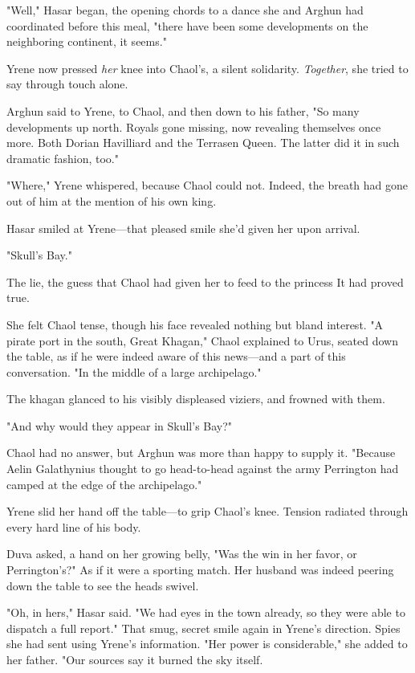 "Well," Hasar began, the opening chords to a dance she and Arghun had coordinated before this meal, "there have been some 
developments on the neighboring continent, it seems."

Yrene now pressed \emph{her} knee into Chaol's, a silent solidarity.
\emph{Together}, she tried to say through touch alone.

Arghun said to Yrene, to Chaol, and then down to his father, "So many developments up north. Royals gone missing, now revealing themselves once more. Both Dorian Havilliard and the Terrasen Queen. The latter did it in such dramatic fashion, too."

"Where," Yrene whispered, because Chaol could not. Indeed, the breath had gone out of him at the mention of his own king.

Hasar smiled at Yrene---that pleased smile she'd given her upon arrival.

"Skull's Bay."

The lie, the guess that Chaol had given her to feed to the princess
 It had proved true.

She felt Chaol tense, though his face revealed nothing but bland interest. "A pirate port in the south, Great Khagan," Chaol explained to Urus, seated down the table, as if he were indeed aware of this news---and a part of this conversation. "In the middle of a large archipelago."

The khagan glanced to his visibly displeased viziers, and frowned with them.

"And why would they appear in Skull's Bay?"

Chaol had no answer, but Arghun was more than happy to supply it. "Because Aelin Galathynius thought to go head-to-head against the army Perrington had camped at the edge of the archipelago."

Yrene slid her hand off the table---to grip Chaol's knee. Tension radiated through every hard line of his body.

Duva asked, a hand on her growing belly, "Was the win in her favor, or Perrington's?" As if it were a sporting match. Her husband was indeed peering down the table to see the heads swivel.

"Oh, in hers," Hasar said. "We had eyes in the town already, so they were able to dispatch a full report." That smug, secret smile again in Yrene's direction. Spies she had sent using Yrene's information. "Her power is considerable," she added to her father. "Our sources say it burned the sky itself.

